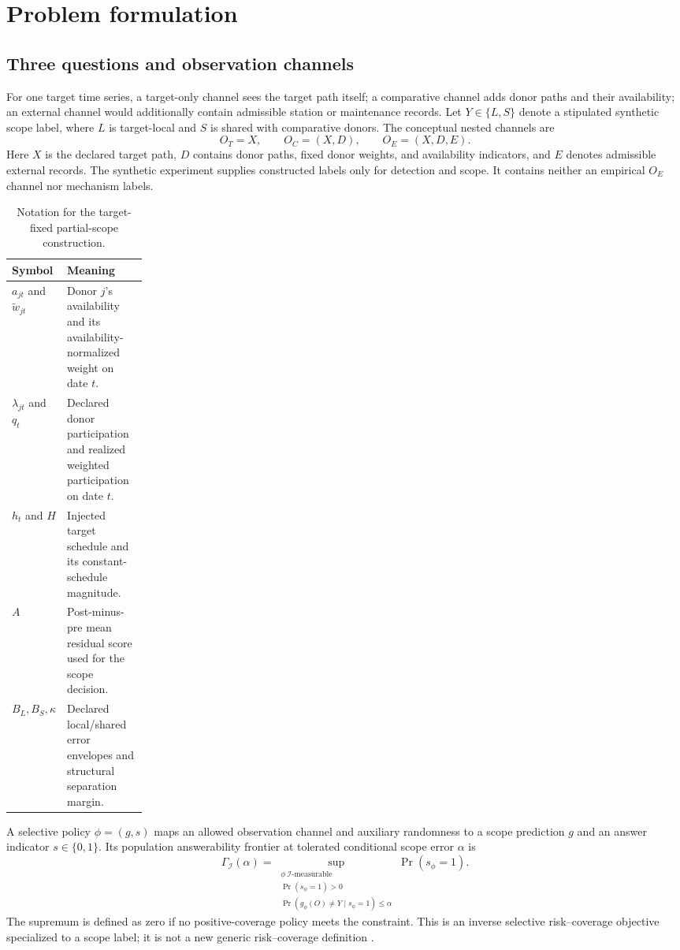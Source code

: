 \section{Problem formulation}
\suppressfloats[t]
\label{sec:problem}

\subsection{Three questions and observation channels}

For one target time series, a target-only channel sees the target path itself; a
comparative channel adds donor paths and their availability; an external channel
would additionally contain admissible station or maintenance records. Let
$Y\in\{L,S\}$ denote a stipulated synthetic scope label, where $L$ is
target-local and $S$ is shared with comparative donors. The conceptual nested
channels are
\[
  O_T=X,\qquad O_C=(X,D),\qquad O_E=(X,D,E).
\]
Here $X$ is the declared target path, $D$ contains donor paths, fixed donor
weights, and availability indicators, and $E$ denotes admissible external
records. The synthetic experiment supplies constructed labels only for
detection and scope. It contains neither an empirical $O_E$ channel nor
mechanism labels.

\begin{table}[tbp]
\centering
\caption{Notation for the target-fixed partial-scope construction.}
\label{tab:scope-notation}
\small
\begin{tabularx}{\linewidth}{@{}p{0.20\linewidth}X@{}}
\toprule
Symbol & Meaning \\
\midrule
$a_{jt}$ and $\widetilde w_{jt}$ & Donor $j$'s availability and its
availability-normalized weight on date $t$. \\
$\lambda_{jt}$ and $q_t$ & Declared donor participation and realized weighted
participation on date $t$. \\
$h_t$ and $H$ & Injected target schedule and its constant-schedule magnitude. \\
$A$ & Post-minus-pre mean residual score used for the scope decision. \\
$B_L,B_S,\kappa$ & Declared local/shared error envelopes and structural
separation margin. \\
\bottomrule
\end{tabularx}
\end{table}

A selective policy $\phi=(g,s)$ maps an allowed observation channel and
auxiliary randomness to a scope prediction $g$ and an answer indicator
$s\in\{0,1\}$. Its population answerability frontier at tolerated conditional
scope error $\alpha$ is
\[
  \Gamma_{\mathcal I}(\alpha)=
  \sup_{\substack{\phi\ \mathcal I\text{-measurable}\\
                  \Pr(s_\phi=1)>0\\
                  \Pr(g_\phi(O)\ne Y\mid s_\phi=1)\leq\alpha}}
  \Pr(s_\phi=1).
\]
The supremum is defined as zero if no positive-coverage policy meets the
constraint. This is an inverse selective risk--coverage objective specialized
to a scope label; it is not a new generic risk--coverage definition
\citep{elyaniv2010,franc2023}.

